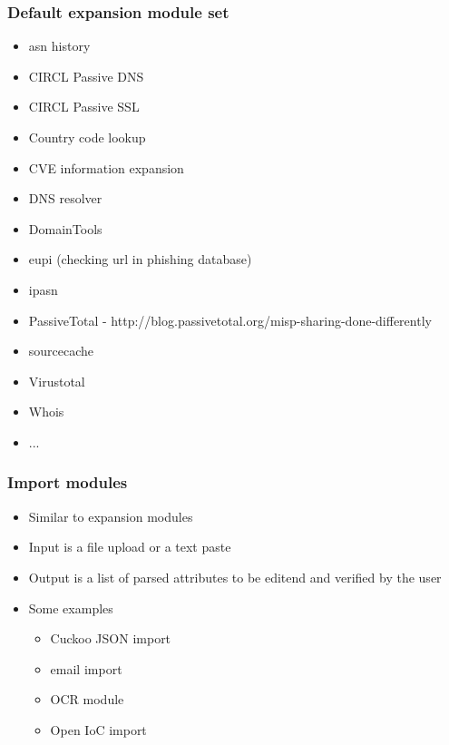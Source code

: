 \begin{frame}[fragile]
        \frametitle{Default expansion module set}
        \begin{itemize}
                \item asn history
                \item CIRCL Passive DNS
                \item CIRCL Passive SSL
                \item Country code lookup
                \item CVE information expansion
                \item DNS resolver
                \item DomainTools
                \item eupi (checking url in phishing database)
                \item ipasn
                \item PassiveTotal - http://blog.passivetotal.org/misp-sharing-done-differently
                \item sourcecache
                \item Virustotal
                \item Whois
                \item ...
        \end{itemize}
\end{frame}

\begin{frame}[fragile]
        \frametitle{Import modules}
        \begin{itemize}
            \item Similar to expansion modules
            \item Input is a file upload or a text paste
            \item Output is a list of parsed attributes to be editend and verified by the user
            \item Some examples
            \begin{itemize}
                \item Cuckoo JSON import
                \item email import
                \item OCR module
                \item Open IoC import
            \end{itemize}
       \end{itemize}
\end{frame}

